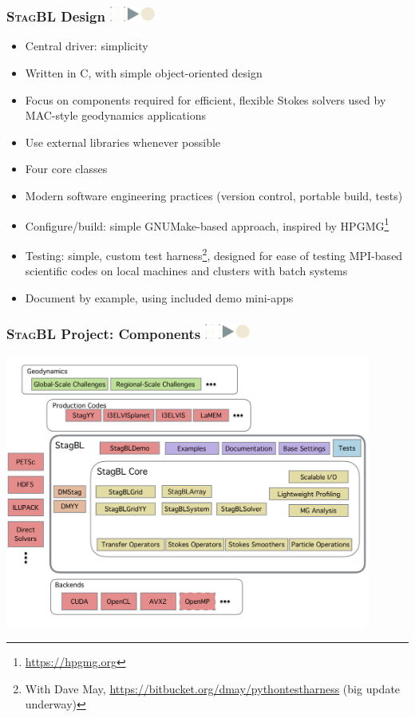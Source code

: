 \documentclass{beamer}
\newcommand\frametitlelogo[1]{\frametitle{#1\hspace{0pt plus 1 filll} \includegraphics[width=42pt]{logo_slides}}}
\newcommand{\StagBL}{\textsc{StagBL}}
\begin{document}
\begin{frame}[fragile]
  \frametitlelogo{\StagBL{} Design}
  \begin{itemize}
  \item Central driver: simplicity
  \item Written in C, with simple object-oriented design
  \item Focus on components required for efficient, flexible Stokes solvers used by MAC-style geodynamics applications
  \item Use external libraries whenever possible
  \item Four core classes
  \item Modern software engineering practices (version control, portable build, tests)
  \item Configure/build: simple GNUMake-based approach, inspired by HPGMG\footnote{\url{https://hpgmg.org}}
  \item Testing: simple, custom test harness\footnote{With Dave May, \url{https://bitbucket.org/dmay/pythontestharness} (big update underway)}, designed for ease of testing MPI-based scientific codes on local machines and clusters with batch systems
  \item Document by example, using included demo mini-apps
  \end{itemize}
\end{frame}

\begin{frame}[fragile]
\frametitlelogo{\StagBL{} Project: Components}
\begin{center}
  \includegraphics[width=0.9\textwidth]{images/components.pdf}
\end{center}
\end{frame}
\end{document}

